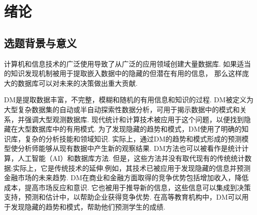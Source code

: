 \documentclass[bachelor,adobefonts]{jnuthesis}
\begin{document}
\tableofcontents

\mainmatter


\chapter{绪论}\label{chapter_introduction}
\section{选题背景与意义}
计算机和信息技术的广泛使用导致了从广泛的应用领域创建大量数据库\cite{Li2002Unsupervised}.
如果适当的知识发现机制被用于提取嵌入数据中的隐藏的但潜在有用的信息\cite{Ahmad2007A}，   
那么这样庞大的数据库可以对未来的决策做出重大贡献. 

DM是提取数据丰富，不完整，模糊和随机的有用信息和知识的过程\cite{李佩2005Agent, Pan2006Incorporating, Qian2009A}.    
DM被定义为大型复杂数据集的自动或半自动探索性数据分析，可用于揭示数据中的模式和关系，并强调大型观测数据库\cite{Miller2015A}. 
  现代统计和计算技术被应用于这个问题，以便找到隐藏在大型数据库中的有用模式\cite{Tsantis2001Enhancing, Sharma2015An}.
为了发现隐藏的趋势和模式，DM使用了明确的知识库，复杂的分析技能和领域知识.
实际上，通过DM的趋势和模式形成的预测模型使分析师能够从现有数据中产生新的观察结果. 
 DM方法也可以被看作是统计计算，人工智能（AI）和数据库方法.
 但是，这些方法并没有取代现有的传统统计数据;实际上，它是传统技术的延伸.例如，其技术已被应用于发现隐藏的信息并预测金融市场的未来趋势. 
 DM在商业和金融方面取得的竞争优势包括增加收入，降低成本，提高市场反应和意识\cite{Zhang2004Discovering}.
 它也被用于推导新的信息，这些信息可以集成到决策支持，预测和估计中，以帮助企业获得竞争优势.  
 在高等教育机构中，DM可以用于发现隐藏的趋势和模式，帮助他们预测学生的成绩. 
 
\end{document}
